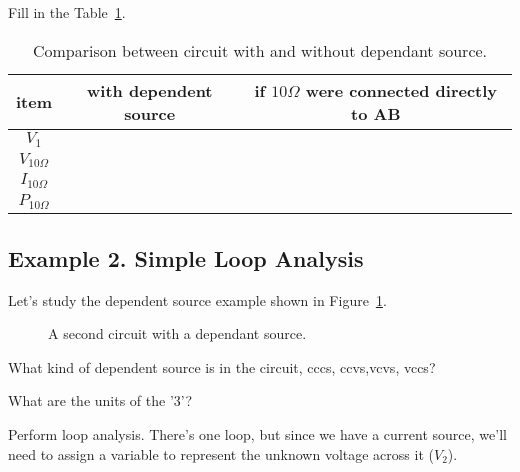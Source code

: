 \begin{clevel}
Fill in the Table~\ref{T:5DS}.
\end{clevel}

\begin{table}[H]
\begin{center}
\begin{tabular}{|c|c|c|} \hline
item&with dependent source&if $10\Omega$ were connected directly to AB \\ \hline
$V_1$&& \\ \hline
$V_{10\Omega}$&& \\ \hline
$I_{10\Omega}$&& \\ \hline
$P_{10\Omega}$&& \\ \hline
\end{tabular}
\caption{Comparison between circuit with and without dependant source.}
\label{T:5DS}
\end{center}
\end{table}

\subsection{Example 2. Simple Loop Analysis}
Let's study the dependent source example shown in Figure~\ref{F:5DSb}.

\begin{figure}[H]
\begin{center}
\caption{A second circuit with a dependant source.}
\label{F:5DSb}
\end{center}
\end{figure}

\begin{alevel}
What kind of dependent source is in the circuit, cccs, ccvs,vcvs, vccs?
\end{alevel}

\begin{blevel}
What are the units of the '3'?
\end{blevel}

Perform loop analysis. There's one loop, but since we have a current source, we'll need to assign a variable to represent the unknown voltage across it ($V_2$). \par

